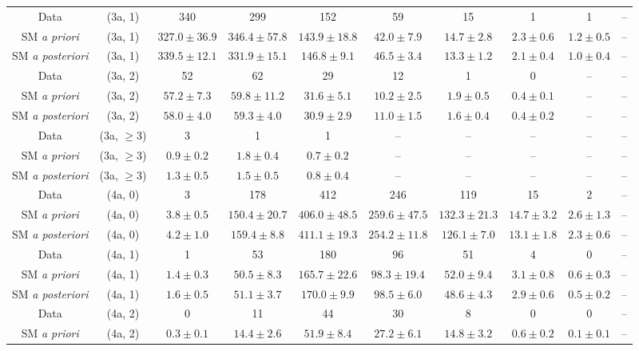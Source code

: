 \begin{table}[h!]
{\begin{tabular}{cccccccccc}
	Data & (3a, 1) & 340 & 299 & 152 & 59 & 15 & 1 & 1 & -- \\[0.5ex] 
	SM \textit{a priori} & (3a, 1) & $327.0\pm 36.9$ & $346.4\pm 57.8$ & $143.9\pm 18.8$ & $42.0\pm 7.9$ & $14.7\pm 2.8$ & $2.3\pm 0.6$ & $1.2\pm 0.5$ & -- \\[0.5ex] 
	SM \textit{a posteriori} & (3a, 1) & $339.5\pm 12.1$ & $331.9\pm 15.1$ & $146.8\pm 9.1$ & $46.5\pm 3.4$ & $13.3\pm 1.2$ & $2.1\pm 0.4$ & $1.0\pm 0.4$ & -- \\[0.5ex] 
	Data & (3a, 2) & 52 & 62 & 29 & 12 & 1 & 0 & -- & -- \\[0.5ex] 
	SM \textit{a priori} & (3a, 2) & $57.2\pm 7.3$ & $59.8\pm 11.2$ & $31.6\pm 5.1$ & $10.2\pm 2.5$ & $1.9\pm 0.5$ & $0.4\pm 0.1$ & -- & -- \\[0.5ex] 
	SM \textit{a posteriori} & (3a, 2) & $58.0\pm 4.0$ & $59.3\pm 4.0$ & $30.9\pm 2.9$ & $11.0\pm 1.5$ & $1.6\pm 0.4$ & $0.4\pm 0.2$ & -- & -- \\[0.5ex] 
	Data & (3a, $\ge3$) & 3 & 1 & 1 & -- & -- & -- & -- & -- \\[0.5ex] 
	SM \textit{a priori} & (3a, $\ge3$) & $0.9\pm 0.2$ & $1.8\pm 0.4$ & $0.7\pm 0.2$ & -- & -- & -- & -- & -- \\[0.5ex] 
	SM \textit{a posteriori} & (3a, $\ge3$) & $1.3\pm 0.5$ & $1.5\pm 0.5$ & $0.8\pm 0.4$ & -- & -- & -- & -- & -- \\[0.5ex] 
	Data & (4a, 0) & 3 & 178 & 412 & 246 & 119 & 15 & 2 & -- \\[0.5ex] 
	SM \textit{a priori} & (4a, 0) & $3.8\pm 0.5$ & $150.4\pm 20.7$ & $406.0\pm 48.5$ & $259.6\pm 47.5$ & $132.3\pm 21.3$ & $14.7\pm 3.2$ & $2.6\pm 1.3$ & -- \\[0.5ex] 
	SM \textit{a posteriori} & (4a, 0) & $4.2\pm 1.0$ & $159.4\pm 8.8$ & $411.1\pm 19.3$ & $254.2\pm 11.8$ & $126.1\pm 7.0$ & $13.1\pm 1.8$ & $2.3\pm 0.6$ & -- \\[0.5ex] 
	Data & (4a, 1) & 1 & 53 & 180 & 96 & 51 & 4 & 0 & -- \\[0.5ex] 
	SM \textit{a priori} & (4a, 1) & $1.4\pm 0.3$ & $50.5\pm 8.3$ & $165.7\pm 22.6$ & $98.3\pm 19.4$ & $52.0\pm 9.4$ & $3.1\pm 0.8$ & $0.6\pm 0.3$ & -- \\[0.5ex] 
	SM \textit{a posteriori} & (4a, 1) & $1.6\pm 0.5$ & $51.1\pm 3.7$ & $170.0\pm 9.9$ & $98.5\pm 6.0$ & $48.6\pm 4.3$ & $2.9\pm 0.6$ & $0.5\pm 0.2$ & -- \\[0.5ex] 
	Data & (4a, 2) & 0 & 11 & 44 & 30 & 8 & 0 & 0 & -- \\[0.5ex] 
	SM \textit{a priori} & (4a, 2) & $0.3\pm 0.1$ & $14.4\pm 2.6$ & $51.9\pm 8.4$ & $27.2\pm 6.1$ & $14.8\pm 3.2$ & $0.6\pm 0.2$ & $0.1\pm 0.1$ & -- \\[0.5ex] 

\end{tabular}}
\end{table}
